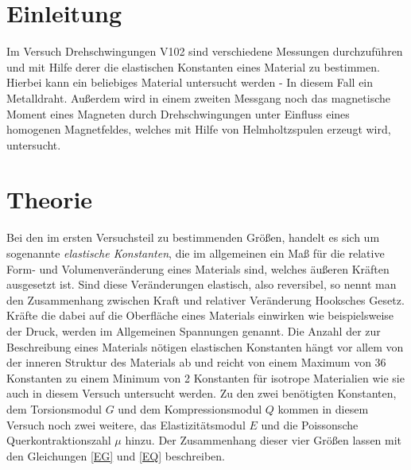 



  \section{Einleitung}
    Im Versuch Drehschwingungen V102 sind verschiedene Messungen durchzuführen und mit Hilfe 
    derer die elastischen Konstanten eines Material zu bestimmen. Hierbei kann ein beliebiges Material 
    untersucht werden - In diesem Fall ein Metalldraht. 
    Außerdem wird in einem zweiten Messgang noch das magnetische Moment eines Magneten durch 
    Drehschwingungen unter Einfluss eines homogenen Magnetfeldes, welches mit Hilfe von Helmholtzspulen erzeugt wird, untersucht.


  
  
  
  
  
    
    
    
    
    
    
  \section{Theorie}
    Bei den im ersten Versuchsteil zu bestimmenden Größen, handelt es sich um sogenannte \emph{elastische Konstanten},
    die im allgemeinen ein Maß für die relative Form- und Volumenveränderung eines Materials sind, welches äußeren Kräften
    ausgesetzt ist. Sind diese Veränderungen elastisch, also reversibel, so nennt man den Zusammenhang zwischen Kraft und 
    relativer Veränderung Hooksches Gesetz. 
    Kräfte die dabei auf die Oberfläche eines Materials einwirken wie beispielsweise der Druck, werden
    im Allgemeinen Spannungen genannt. Die Anzahl der zur Beschreibung eines Materials nötigen elastischen Konstanten 
    hängt vor allem von der inneren Struktur des Materials ab und reicht von einem Maximum von 36 Konstanten zu einem
    Minimum von 2 Konstanten für isotrope Materialien wie sie auch in diesem Versuch untersucht werden.
    Zu den zwei benötigten Konstanten, dem Torsionsmodul $G$ und dem Kompressionsmodul $Q$ kommen in diesem Versuch
    noch zwei weitere, das Elastizitätsmodul $E$ und die Poissonsche Querkontraktionszahl $\mu$ hinzu.
    Der Zusammenhang dieser vier Größen lassen mit den Gleichungen \eqref{EG} und \eqref{EQ} beschreiben.
    
